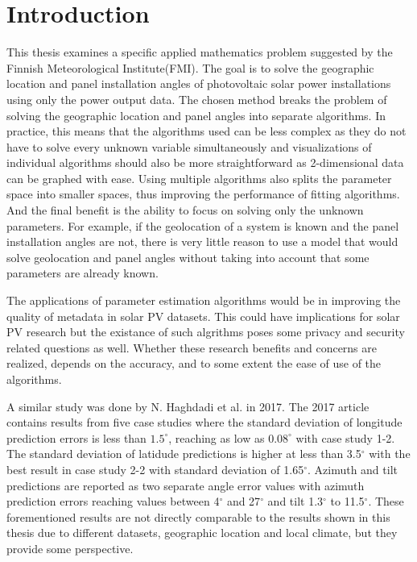 \chapter{Introduction}


This thesis examines a specific applied mathematics problem suggested by the Finnish Meteorological Institute(FMI). The goal is to solve the geographic location and panel installation angles of photovoltaic solar power installations using only the power output data. The chosen method breaks the problem of solving the geographic location and panel angles into separate algorithms. In practice, this means that the algorithms used can be less complex as they do not have to solve every unknown variable simultaneously and visualizations of individual algorithms should also be more straightforward as 2-dimensional data can be graphed with ease. Using multiple algorithms also splits the parameter space into smaller spaces, thus improving the performance of fitting algorithms. And the final benefit is the ability to focus on solving only the unknown parameters. For example, if the geolocation of a system is known and the panel installation angles are not, there is very little reason to use a model that would solve geolocation and panel angles without taking into account that some parameters are already known. 


The applications of parameter estimation algorithms would be in improving the quality of metadata in solar PV datasets. This could have implications for solar PV research but the existance of such algrithms poses some privacy and security related questions as well. Whether these research benefits and concerns are realized, depends on the accuracy, and to some extent the ease of use of the algorithms.


A similar study was done by N. Haghdadi et al. in 2017\cite{navid_australian_article}. The 2017 article contains results from five case studies where the standard deviation of longitude prediction errors is less than $1.5^\circ$, reaching as low as $0.08^\circ$ with case study 1-2. The standard deviation of latidude predictions is higher at less than 3.5$^\circ$ with the best result in case study 2-2 with standard deviation of 1.65$^\circ$. Azimuth and tilt predictions are reported as two separate angle error values with azimuth prediction errors reaching values between 4$^\circ$ and 27$^\circ$ and tilt 1.3$^\circ$ to 11.5$^\circ$. These forementioned results are not directly comparable to the results shown in this thesis due to different datasets, geographic location and local climate, but they provide some perspective.





